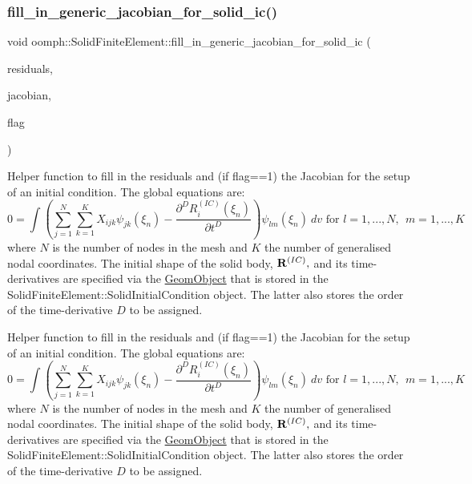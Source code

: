\mbox{\label{classoomph_1_1SolidFiniteElement_a6baa515639dc04784c9bcd3b691f4f8c}} 
\subsubsection{\texorpdfstring{fill\+\_\+in\+\_\+generic\+\_\+jacobian\+\_\+for\+\_\+solid\+\_\+ic()}{fill\_in\_generic\_jacobian\_for\_solid\_ic()}}
{\footnotesize\ttfamily void oomph\+::\+Solid\+Finite\+Element\+::fill\+\_\+in\+\_\+generic\+\_\+jacobian\+\_\+for\+\_\+solid\+\_\+ic (\begin{DoxyParamCaption}\item[{\hyperlink{classoomph_1_1Vector}{Vector}$<$ double $>$ \&}]{residuals,  }\item[{\hyperlink{classoomph_1_1DenseMatrix}{Dense\+Matrix}$<$ double $>$ \&}]{jacobian,  }\item[{const unsigned \&}]{flag }\end{DoxyParamCaption})\hspace{0.3cm}{\ttfamily [protected]}}



Helper function to fill in the residuals and (if flag==1) the Jacobian for the setup of an initial condition. The global equations are\+: \[ 0 = \int \left( \sum_{j=1}^N \sum_{k=1}^K X_{ijk} \psi_{jk}(\xi_n) - \frac{\partial^D R^{(IC)}_i(\xi_n)}{\partial t^D} \right) \psi_{lm}(\xi_n) \ dv \mbox{ \ \ \ \ for \ \ \ $l=1,...,N, \ \ m=1,...,K$} \] where $ N $ is the number of nodes in the mesh and $ K $ the number of generalised nodal coordinates. The initial shape of the solid body, $ {\bf R}^{(IC)},$ and its time-\/derivatives are specified via the {\ttfamily \hyperlink{classoomph_1_1GeomObject}{Geom\+Object}} that is stored in the {\ttfamily Solid\+Finite\+Element\+::\+Solid\+Initial\+Condition} object. The latter also stores the order of the time-\/derivative $ D $ to be assigned. 

Helper function to fill in the residuals and (if flag==1) the Jacobian for the setup of an initial condition. The global equations are\+: \[ 0 = \int \left( \sum_{j=1}^N \sum_{k=1}^K X_{ijk} \psi_{jk}(\xi_n) - \frac{\partial^D R^{(IC)}_i(\xi_n)}{\partial t^D} \right) \psi_{lm}(\xi_n) \ dv \mbox{ \ \ \ \ for \ \ \ $l=1,...,N, \ \ m=1,...,K$} \] where $ N $ is the number of nodes in the mesh and $ K $ the number of generalised nodal coordinates. The initial shape of the solid body, $ {\bf R}^{(IC)},$ and its time-\/derivatives are specified via the {\ttfamily \hyperlink{classoomph_1_1GeomObject}{Geom\+Object}} that is stored in the {\ttfamily Solid\+Finite\+Element\+::\+Solid\+Initial\+Condition} object. The latter also stores the order of the time-\/derivative $ D $ to be assigned. 

